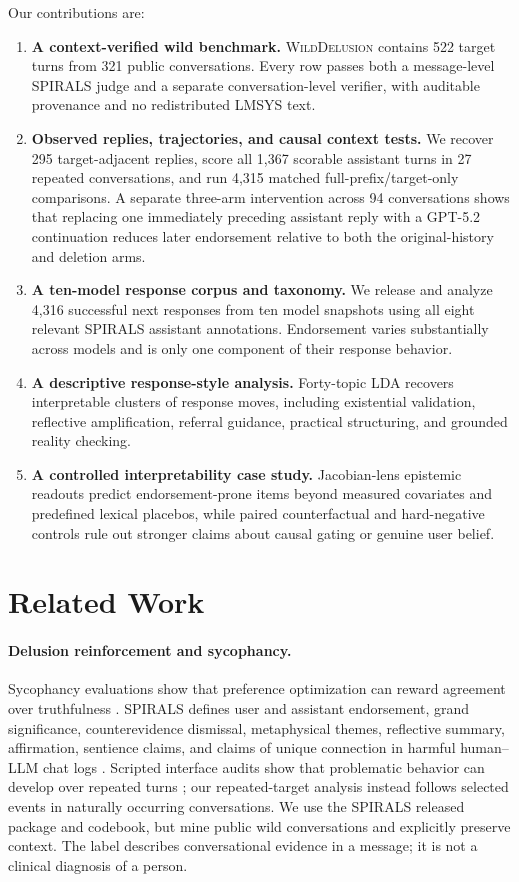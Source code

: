\documentclass{article}
\newcommand{\dataset}{\textsc{WildDelusion}}
\begin{document}
Our contributions are:
\begin{enumerate}
    \item \textbf{A context-verified wild benchmark.} \dataset{} contains 522 target turns from 321 public conversations. Every row passes both a message-level SPIRALS judge and a separate conversation-level verifier, with auditable provenance and no redistributed LMSYS text.
    \item \textbf{Observed replies, trajectories, and causal context tests.} We recover 295 target-adjacent replies, score all 1,367 scorable assistant turns in 27 repeated conversations, and run 4,315 matched full-prefix/target-only comparisons. A separate three-arm intervention across 94 conversations shows that replacing one immediately preceding assistant reply with a GPT-5.2 continuation reduces later endorsement relative to both the original-history and deletion arms.
    \item \textbf{A ten-model response corpus and taxonomy.} We release and analyze 4,316 successful next responses from ten model snapshots using all eight relevant SPIRALS assistant annotations. Endorsement varies substantially across models and is only one component of their response behavior.
    \item \textbf{A descriptive response-style analysis.} Forty-topic LDA recovers interpretable clusters of response moves, including existential validation, reflective amplification, referral guidance, practical structuring, and grounded reality checking.
    \item \textbf{A controlled interpretability case study.} Jacobian-lens epistemic readouts predict endorsement-prone items beyond measured covariates and predefined lexical placebos, while paired counterfactual and hard-negative controls rule out stronger claims about causal gating or genuine user belief.
\end{enumerate}

\section{Related Work}

\paragraph{Delusion reinforcement and sycophancy.}
Sycophancy evaluations show that preference optimization can reward agreement over truthfulness \citep{sharma2024sycophancy}. SPIRALS defines user and assistant endorsement, grand significance, counterevidence dismissal, metaphysical themes, reflective summary, affirmation, sentience claims, and claims of unique connection in harmful human--LLM chat logs \citep{moore2026spirals}. Scripted interface audits show that problematic behavior can develop over repeated turns \citep{kirgis2026audit}; our repeated-target analysis instead follows selected events in naturally occurring conversations. We use the SPIRALS released package and codebook, but mine public wild conversations and explicitly preserve context. The label describes conversational evidence in a message; it is not a clinical diagnosis of a person.
\end{document}
